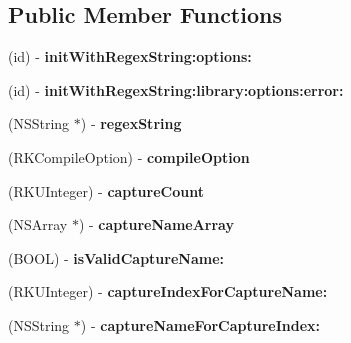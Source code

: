 \subsection*{Public Member Functions}
\begin{DoxyCompactItemize}
\item 
\hypertarget{interface_r_k_regex_a09c782cb88bbf39417598d137cd2f179}{(id) -\/ {\bfseries init\-With\-Regex\-String\-:options\-:}}\label{interface_r_k_regex_a09c782cb88bbf39417598d137cd2f179}

\item 
\hypertarget{interface_r_k_regex_a7c3af7648115f2edb42bb59beafafc9c}{(id) -\/ {\bfseries init\-With\-Regex\-String\-:library\-:options\-:error\-:}}\label{interface_r_k_regex_a7c3af7648115f2edb42bb59beafafc9c}

\item 
\hypertarget{interface_r_k_regex_a14f61c1e7cdd39971963e66988e7f60f}{(N\-S\-String $\ast$) -\/ {\bfseries regex\-String}}\label{interface_r_k_regex_a14f61c1e7cdd39971963e66988e7f60f}

\item 
\hypertarget{interface_r_k_regex_a4a46ed536513f45f934098109159e86f}{(R\-K\-Compile\-Option) -\/ {\bfseries compile\-Option}}\label{interface_r_k_regex_a4a46ed536513f45f934098109159e86f}

\item 
\hypertarget{interface_r_k_regex_a933d645e53bc3011cf043bbe69647191}{(R\-K\-U\-Integer) -\/ {\bfseries capture\-Count}}\label{interface_r_k_regex_a933d645e53bc3011cf043bbe69647191}

\item 
\hypertarget{interface_r_k_regex_a85c7c3e1008c41063a3cef874bb09e5f}{(N\-S\-Array $\ast$) -\/ {\bfseries capture\-Name\-Array}}\label{interface_r_k_regex_a85c7c3e1008c41063a3cef874bb09e5f}

\item 
\hypertarget{interface_r_k_regex_a41148691b39fea4c7abeb85498044470}{(B\-O\-O\-L) -\/ {\bfseries is\-Valid\-Capture\-Name\-:}}\label{interface_r_k_regex_a41148691b39fea4c7abeb85498044470}

\item 
\hypertarget{interface_r_k_regex_a64f0e9b631149094cc7227adb0a2ec39}{(R\-K\-U\-Integer) -\/ {\bfseries capture\-Index\-For\-Capture\-Name\-:}}\label{interface_r_k_regex_a64f0e9b631149094cc7227adb0a2ec39}

\item 
\hypertarget{interface_r_k_regex_adea1582c8fc35ad3408445c8467b3828}{(N\-S\-String $\ast$) -\/ {\bfseries capture\-Name\-For\-Capture\-Index\-:}}\label{interface_r_k_regex_adea1582c8fc35ad3408445c8467b3828}


\end{DoxyCompactItemize}
